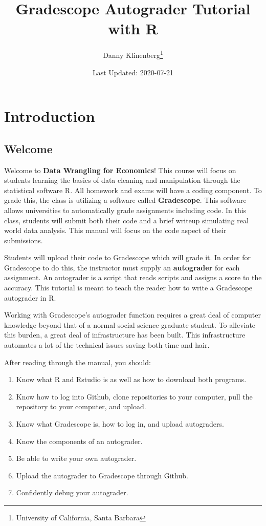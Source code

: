 \documentclass[
]{article}
\title{Gradescope Autograder Tutorial with R}
\author{Danny Klinenberg\footnote{University of California, Santa Barbara}}
\date{Last Updated: 2020-07-21}
\begin{document}
\maketitle

{
\hypersetup{linkcolor=}
\setcounter{tocdepth}{2}
\tableofcontents
}
\newpage

\hypertarget{introduction}{%
\section{Introduction}\label{introduction}}

\hypertarget{welcome}{%
\subsection{Welcome}\label{welcome}}

Welcome to \textbf{Data Wrangling for Economics}! This course will focus
on students learning the basics of data cleaning and manipulation
through the statistical software R. All homework and exams will have a
coding component. To grade this, the class is utilizing a software
called \textbf{Gradescope}. This software allows universities to
automatically grade assignments including code. In this class, students
will submit both their code and a brief writeup simulating real world
data analysis. This manual will focus on the code aspect of their
submissions.

Students will upload their code to Gradescope which will grade it. In
order for Gradescope to do this, the instructor must supply an
\textbf{autograder} for each assignment. An autograder is a script that
reads scripts and assigns a score to the accuracy. This tutorial is
meant to teach the reader how to write a Gradescope autograder in R.

Working with Gradescope's autograder function requires a great deal of
computer knowledge beyond that of a normal social science graduate
student. To alleviate this burden, a great deal of infrastructure has
been built. This infrastructure automates a lot of the technical issues
saving both time and hair.

After reading through the manual, you should:

\begin{enumerate}
\def\labelenumi{(\arabic{enumi})}
\item
  Know what R and Rstudio is as well as how to download both programs.
\item
  Know how to log into Github, clone repositories to your computer, pull
  the repository to your computer, and upload.
\item
  Know what Gradescope is, how to log in, and upload autograders.
\item
  Know the components of an autograder.
\item
  Be able to write your own autograder.
\item
  Upload the autograder to Gradescope through Github.
\item
  Confidently debug your autograder.
\end{enumerate}
\end{document}

